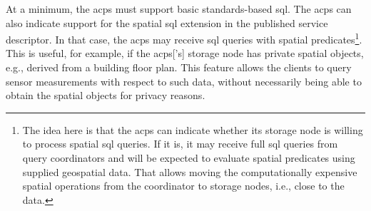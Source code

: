 At a minimum, the \gls{acps} must support basic standards-based \gls{sql}. The \gls{acps} can also indicate support for the spatial \gls{sql} extension in the published service descriptor. In that case, the \gls{acps} may receive \gls{sql} queries with spatial predicates\footnote{The idea here is that the \gls{acps} can indicate whether its storage node is willing to process spatial \gls{sql} queries. If it is, it may receive full \gls{sql} queries from query coordinators and will be expected to evaluate spatial predicates using supplied geospatial data. That allows moving the computationally expensive spatial operations from the coordinator to storage nodes, i.e., close to the data.}. This is useful, for example, if the \gls{acps}['s] storage node has private spatial objects, e.g., derived from a building floor plan. This feature allows the clients to query sensor measurements with respect to such data, without necessarily being able to obtain the spatial objects for privacy reasons.

